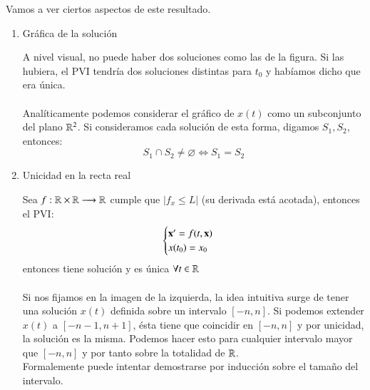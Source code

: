 \begin{obs}
    Vamos a ver ciertos aspectos de este resultado.\\
    \begin{enumerate}
        \item  Gráfica de la solución\\
        \begin{minipage}[c]{0.5\linewidth}
          \begin{center}
          \end{center}
        \end{minipage}\hfill
        \begin{minipage}[c]{0.45\textwidth}
            A nivel visual, no puede haber dos soluciones como las de la figura. Si las hubiera, el PVI tendría dos soluciones distintas para $t_0$ y habíamos dicho que era única.\\\\
            Analíticamente podemos considerar el gráfico de $x(t)$ como un subconjunto del plano $\mathbb{R}^2$. Si consideramos cada solución de esta forma, digamos $S_1, S_2$, entonces:
            $$
                S_1 \cap S_2 \neq \varnothing \iff S_1 = S_2
            $$
        \end{minipage}
        \item Unicidad en la recta real\\
        \begin{minipage}[c]{0.5\linewidth}
          \begin{center}
          \end{center}
        \end{minipage}\hfill
        \begin{minipage}[c]{0.45\textwidth}
            Sea $f: \mathbb{R} \times \mathbb{R} \longrightarrow \mathbb{R}$ cumple que $|f_x \leq L|$ (su derivada está acotada), entonces el PVI:
                $$
                    \begin{cases}
                        \mathbf{x'} = f(t, \mathbf{x})\\
                        x(t_0) = x_0
                    \end{cases}
                $$
            entonces tiene solución y es única $ \forall t \in \mathbb{R}$\\\\
            Si nos fijamos en la imagen de la izquierda, la idea intuitiva surge de tener una solución $x(t)$ definida sobre un intervalo $[-n, n]$. Si podemos extender $x(t)$ a $[-n-1, n+1]$, ésta tiene que coincidir en $[-n,n]$ y por unicidad, la solución es la misma. Podemos hacer esto para cualquier intervalo mayor que $[-n,n]$ y por tanto sobre la totalidad de $\mathbb{R}$.\\Formalemente puede intentar demostrarse por inducción sobre el tamaño del intervalo.
        \end{minipage}
    \end{enumerate}
\end{obs}
